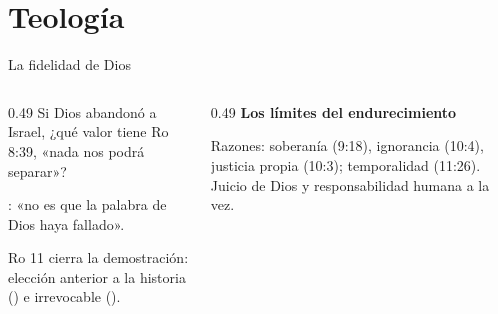 \section{Teología}
\begin{frame}{La fidelidad de Dios}
\begin{columns}[T,onlytextwidth]
\begin{column}{0.49\textwidth}\small\RaggedRight
Si Dios abandonó a Israel, ¿qué valor tiene Ro 8:39, «nada nos podrá separar»?\par\medskip
{}: «no es que la palabra de Dios haya fallado».\par\medskip
Ro 11 cierra la demostración: elección anterior a la historia () e irrevocable ().
\end{column}
\begin{column}{0.49\textwidth}
\centering
{\small\textbf{\textcolor{ladrillo}{Los límites del endurecimiento}}}\par\smallskip
{}\elabpropia
\begin{clave}Razones: soberanía (9:18), ignorancia (10:4), justicia propia (10:3); temporalidad (11:26). Juicio de Dios y responsabilidad humana a la vez.\end{clave}
\end{column}
\end{columns}
\end{frame}


